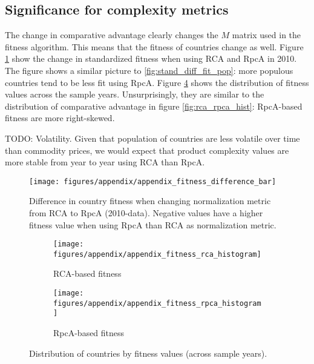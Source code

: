 \documentclass[11pt]{article}
\begin{document}
\begin{appendices}
\subsection{Significance for complexity metrics}
\label{subsec:significance_for_complexity}

The change in comparative advantage clearly changes the $M$ matrix used in the fitness algorithm. This means that the fitness of countries change as well. Figure \ref{fig:bar_plot_diff} show the change in standardized fitness when using RCA and RpcA in 2010. The figure shows a similar picture to \ref{fig:stand_diff_fit_pop}: more populous countries tend to be less fit using RpcA. Figure \ref{fig:rca_rpca_fit_hist} shows the distribution of fitness values across the sample years. Unsurprisingly, they are similar to the distribution of comparative advantage in figure \ref{fig:rca_rpca_hist}: RpcA-based fitness are more right-skewed.

TODO: Volatility. Given that population of countries are less volatile over time than commodity prices, we would expect that product complexity values are more stable from year to year using RCA than RpcA.
\begin{figure}[ht]
  \centering
  \texttt{[image: figures/appendix/appendix\_fitness\_difference\_bar]}
  \caption{Difference in country fitness when changing normalization metric from RCA to RpcA (2010-data). Negative values have a higher fitness value when using RpcA than RCA as normalization metric.}
  \label{fig:bar_plot_diff}
\end{figure}

\begin{figure}
     \centering
     \begin{subfigure}[b]{0.45\textwidth}
         \centering
         \texttt{[image: figures/appendix/appendix\_fitness\_rca\_histogram]}
         \caption{RCA-based fitness}
         \label{fig:rca_fit_hist}
     \end{subfigure}
     \hfill
     \begin{subfigure}[b]{0.45\textwidth}
         \centering
         \texttt{[image: figures/appendix/appendix\_fitness\_rpca\_histogram]}
         \caption{RpcA-based fitness}
         \label{fig:rpca_fit_hist}
     \end{subfigure}
        \caption{Distribution of countries by fitness values (across sample years).}
        \label{fig:rca_rpca_fit_hist}
\end{figure}


\end{appendices}
\end{document}
